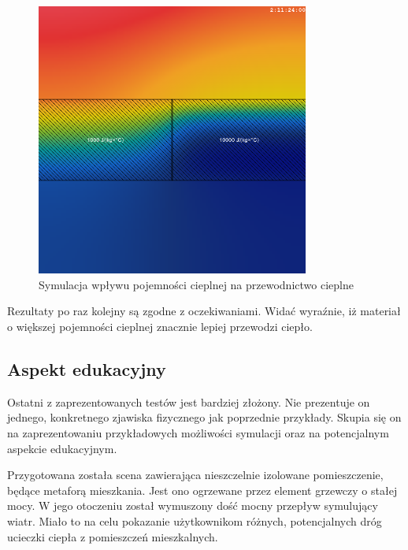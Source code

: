 \begin{figure}[!h]
\centering
\includegraphics[width=0.8\textwidth]{img/physics/heatCapacity}
\caption{Symulacja wpływu pojemności cieplnej na przewodnictwo cieplne}
\label{fig:heatCapacity}
\end{figure}

Rezultaty po raz kolejny są zgodne z oczekiwaniami. Widać wyraźnie, iż materiał
o większej pojemności cieplnej znacznie lepiej przewodzi ciepło.

\subsection{Aspekt edukacyjny}

Ostatni z zaprezentowanych testów jest bardziej złożony. Nie prezentuje on
jednego, konkretnego zjawiska fizycznego jak poprzednie przykłady. Skupia się on
na zaprezentowaniu przykładowych możliwości symulacji oraz na potencjalnym
aspekcie edukacyjnym.

Przygotowana została scena zawierająca nieszczelnie izolowane pomieszczenie,
będące metaforą mieszkania. Jest ono ogrzewane przez element grzewczy o stałej
mocy. W jego otoczeniu został wymuszony dość mocny przepływ symulujący wiatr.
Miało to na celu pokazanie użytkownikom różnych, potencjalnych dróg ucieczki
ciepła z pomieszczeń mieszkalnych.


